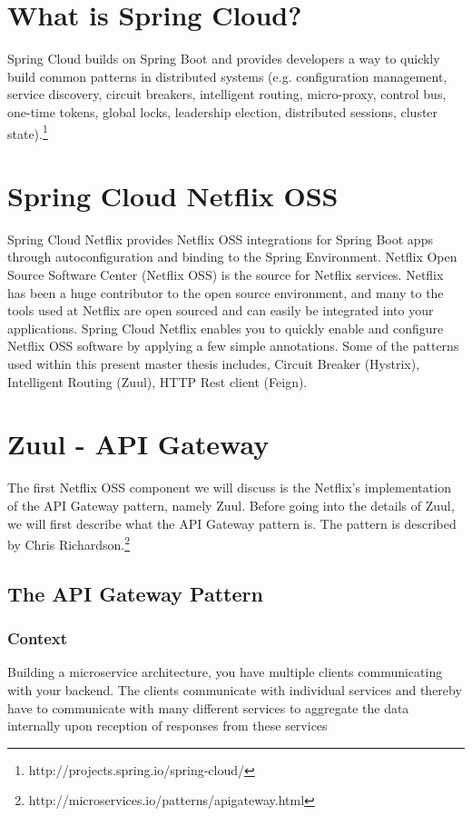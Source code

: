 \newpage
\section*{What is Spring Cloud?}

Spring Cloud builds on Spring Boot and provides developers a way to quickly build common patterns in distributed systems (e.g. configuration management, service discovery, circuit breakers, intelligent routing, micro-proxy, control bus, one-time tokens, global locks, leadership election, distributed sessions, cluster state).\footnote{http://projects.spring.io/spring-cloud/} 


\section*{Spring Cloud Netflix OSS}
Spring Cloud Netflix provides Netflix OSS integrations for Spring Boot apps through autoconfiguration and binding to the Spring Environment. Netflix Open Source Software Center (Netflix OSS) is the source for Netflix services. Netflix has been a huge contributor to the open source environment, and many to the tools used at Netflix are open sourced and can easily be integrated into your applications. Spring Cloud Netflix enables you to quickly enable and configure Netflix OSS software by applying a few simple annotations. Some of the patterns used within this present master thesis includes, Circuit Breaker (Hystrix), Intelligent Routing (Zuul), HTTP Rest client (Feign).

\section*{Zuul - API Gateway}
The first Netflix OSS component we will discuss is the Netflix's implementation of the API Gateway pattern, namely Zuul. Before going into the details of Zuul, we will first describe what the API Gateway pattern is. The pattern is described by Chris Richardson.\footnote{http://microservices.io/patterns/apigateway.html}
 
\subsection*{The API Gateway Pattern}
\subsubsection*{Context}  
Building a microservice architecture, you have multiple clients communicating with your backend. The clients communicate with individual services and thereby have to communicate with many different services to aggregate the data internally upon reception of responses from these services

